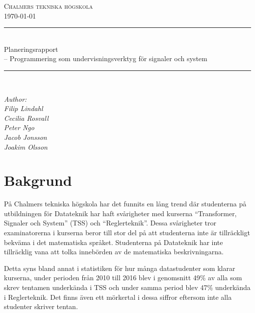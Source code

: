 \documentclass{article}
\begin{document}
\begin{titlepage} \newcommand{\HRule}{\rule{\linewidth}{0.3mm}}
\center
\textsc{\Large Chalmers tekniska högskola}\\[0.05cm] %
\normalsize \today

\HRule \\[0.08cm]
{ \large Planeringsrapport \\ \normalsize{-- Programmering som undervisningsverktyg för signaler och system}}\\[0.08cm] %
\HRule \\[0.3cm]

\vfill

\begin{flushleft} \small
    \emph{Author: \\
    \quad Filip Lindahl\\
    \quad Cecilia Rosvall\\
    \quad Peter Ngo\\
    \quad Jacob Jonsson\\
    \quad Joakim Olsson\\}
\end{flushleft}
\end{titlepage}
\newpage

\section{Bakgrund}
På Chalmers tekniska högskola har det funnits en lång trend
där studenterna på utbildningen för Datateknik har haft
svårigheter med kurserna ``Transformer, Signaler och System''
(TSS) och “Reglerteknik”. Dessa svårigheter tror
examinatorerna i kurserna beror till stor del på att studenterna inte är tillräckligt bekväma i det matematiska språket. Studenterna på Datateknik har inte tillräcklig vana att tolka innebörden av de matematiska beskrivningarna.

Detta syns bland annat i statistiken för hur många
datastudenter som klarar kurserna, under perioden från
2010 till 2016 blev i genomsnitt 49\% av alla som skrev
tentamen underkända i TSS och under samma period blev
47\% underkända i Reglerteknik.
Det finns även ett mörkertal i dessa siffror eftersom inte alla studenter skriver tentan.
\end{document}
